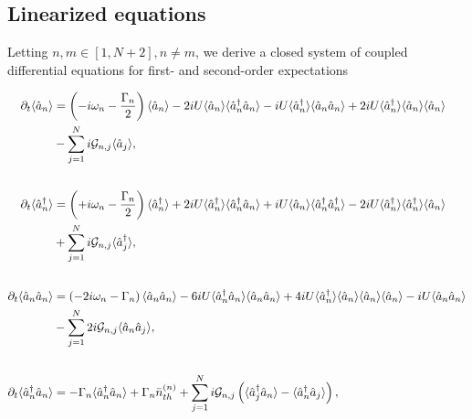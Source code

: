\subsection{Linearized equations}
Letting $n, m \in \left[1, N+2\right], n \ne m$, we derive a closed system of coupled differential equations for first- and second-order expectations


\begin{adjustwidth}{-3cm}{0cm}
\begingroup
\allowdisplaybreaks
\begin{align}\label{eqn:linearsystem}
\partial_t\langle\hat{a}_n\rangle &= \left(- i \omega_n - \frac{\Gamma_n}{2}\right)\langle\hat{a}_n\rangle - 2 i U \langle\hat{a}_n\rangle\langle\hat{a}_n^\dagger\hat{a}_n\rangle - i U \langle\hat{a}_n^\dagger\rangle\langle\hat{a}_n\hat{a}_n\rangle + 2 i U \langle\hat{a}_n^\dagger\rangle \langle\hat{a}_n\rangle\langle\hat{a}_n\rangle \notag \\
&- \sum_{j=1}^N i \mathcal{G}_{n, j} \langle\hat{a}_j\rangle, \notag \\[18pt]
%
%
\partial_t\langle\hat{a}_n^\dagger\rangle &= \left(+ i \omega_n - \frac{\Gamma_n}{2} \right) \langle\hat{a}_n^\dagger\rangle + 2 i U \langle\hat{a}_n^\dagger\rangle\langle\hat{a}_n^\dagger\hat{a}_n\rangle + i U \langle\hat{a}_n\rangle\langle\hat{a}_n^\dagger\hat{a}_n^\dagger\rangle - 2 i U\langle\hat{a}_n^\dagger\rangle\langle\hat{a}_n^\dagger\rangle\langle\hat{a}_n\rangle \notag \\
&+ \sum_{j=1}^N i \mathcal{G}_{n,j}\langle\hat{a}_j^\dagger\rangle, \notag \\[18pt]
%
%
\partial_t\langle\hat{a}_n\hat{a}_n\rangle &= \left( - 2 i \omega_n - \Gamma_n\right) \langle\hat{a}_n\hat{a}_n\rangle - 6 i U \langle\hat{a}_n^\dagger \hat{a}_n\rangle \langle\hat{a}_n\hat{a}_n\rangle + 4 i U \langle\hat{a}_n^\dagger\rangle \langle\hat{a}_n\rangle \langle\hat{a}_n\rangle\langle\hat{a}_n\rangle - i U \langle \hat{a}_n\hat{a}_n\rangle \notag \\
&- \sum_{j=1}^N 2 i \mathcal{G}_{n, j}\langle\hat{a}_n\hat{a}_j\rangle,  \notag \\[18pt]
%
%
\partial_t \langle\hat{a}_n^\dagger\hat{a}_n\rangle &= - \Gamma_n\langle\hat{a}_n^\dagger\hat{a}_n\rangle + \Gamma_n \bar{n}_{th}^{\left(n\right)} + \sum_{j=1}^N i \mathcal{G}_{n, j}\left(\langle\hat{a}_j^\dagger\hat{a}_n\rangle - \langle\hat{a}_n^\dagger\hat{a}_j\rangle\right), \notag \\[18pt] 

\end{align}
\end{adjustwidth}
